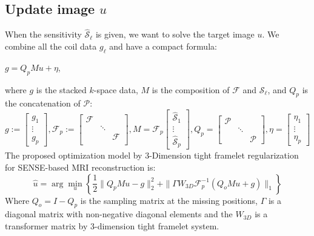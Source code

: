 \documentclass[preprint]{elsarticle}
\begin{document}
\subsection{Update image $u$} When the sensitivity $\mathcal{\hat{S}}_{\ell}$ is given, we want to solve the target image $u$.
We combine all the coil data $g_{\ell}$ and have a compact formula:
\begin{center}\label{eq:SENSE-ObsModel_Toget}
$g=Q_{p}Mu+\eta$,
\par\end{center}
where $g$ is the stacked $k$-space data, $M$ is the composition of
$\mathcal{F}$ and $\mathcal{S}_{\ell}$, and $Q_{p}$ is the concatenation of $ \mathcal{P}$:
$$ g:=\left[\begin{array}{c}
g_{1}\\
\vdots\\
g_{p}
\end{array}\right],\mathcal{F}_p:=\left[
  \begin{array}{ccc}
    \mathcal{F} & \: & \: \\
    \: & \ddots & \: \\
    \: & \:  & \mathcal{F} \\
  \end{array}
\right], M=\mathcal{F}_p\left[\begin{array}{c}
\mathcal{\hat{S}}_{1}\\
\vdots\\
\mathcal{\hat{S}}_{p}
\end{array}\right],Q_{p}=\left[\begin{array}{ccc}
 \mathcal{P} &  & \\
 & \ddots & \\
 & \ &  \mathcal{P}
\end{array}\right],\eta=\left[\begin{array}{c}
\eta_{1}\\
\vdots\\
\eta_{p}
\end{array}\right]$$
The proposed optimization model by  3-Dimension tight framelet regularization  for SENSE-based MRI reconstruction is:
\begin{equation}\label{mod:SENSE-ObsModel_3DReg}
\hat{u}=\arg\min_{u}\left\{ \frac{1}{2}\| Q_{p}Mu-g \|_{2}^{2}+\| \Gamma W_{3D}\mathcal{F}_p^{-1}(Q_{o}Mu+g)\| _{1}\right\}
\end{equation}
Where $Q_{o}= I-Q_{p}$ is the sampling matrix at the missing positions,  $\Gamma$ is a diagonal matrix with non-negative diagonal elements and the $W_{3D}$ is a transformer matrix by 3-dimension tight framelet system.
\end{document}
